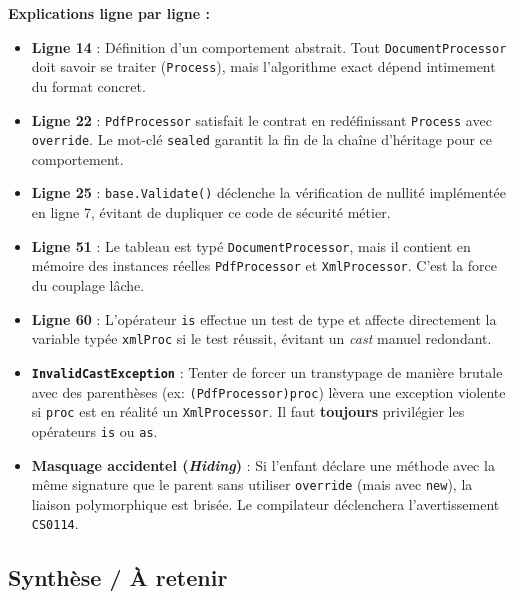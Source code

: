 \textbf{Explications ligne par ligne :}
\begin{itemize}
    \item \textbf{Ligne 14} : Définition d'un comportement abstrait. Tout \texttt{DocumentProcessor} doit savoir se traiter (\texttt{Process}), mais l'algorithme exact dépend intimement du format concret.
    \item \textbf{Ligne 22} : \texttt{PdfProcessor} satisfait le contrat en redéfinissant \texttt{Process} avec \texttt{override}. Le mot-clé \texttt{sealed} garantit la fin de la chaîne d'héritage pour ce comportement.
    \item \textbf{Ligne 25} : \texttt{base.Validate()} déclenche la vérification de nullité implémentée en ligne 7, évitant de dupliquer ce code de sécurité métier.
    \item \textbf{Ligne 51} : Le tableau est typé \texttt{DocumentProcessor}, mais il contient en mémoire des instances réelles \texttt{PdfProcessor} et \texttt{XmlProcessor}. C'est la force du couplage lâche.
    \item \textbf{Ligne 60} : L'opérateur \texttt{is} effectue un test de type et affecte directement la variable typée \texttt{xmlProc} si le test réussit, évitant un \textit{cast} manuel redondant.
\end{itemize}

\begin{tcolorbox}[colback=white,colframe=keywordcolor,title=\textbf{Pièges courants \& Erreurs de compilation}]
    \begin{itemize}
        \item \textbf{\texttt{InvalidCastException}} : Tenter de forcer un transtypage de manière brutale avec des parenthèses (ex: \texttt{(PdfProcessor)proc}) lèvera une exception violente si \texttt{proc} est en réalité un \texttt{XmlProcessor}. Il faut \textbf{toujours} privilégier les opérateurs \texttt{is} ou \texttt{as}.
        \item \textbf{Masquage accidentel (\textit{Hiding})} : Si l'enfant déclare une méthode avec la même signature que le parent sans utiliser \texttt{override} (mais avec \texttt{new}), la liaison polymorphique est brisée. Le compilateur déclenchera l'avertissement \texttt{CS0114}.
    \end{itemize}
\end{tcolorbox}

\subsection{Synthèse / À retenir}

